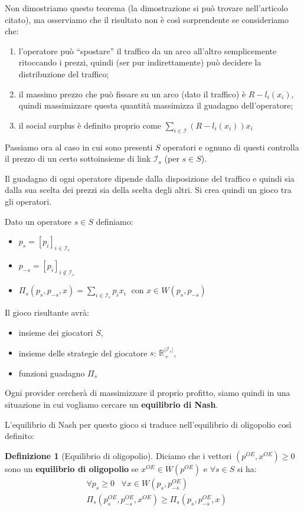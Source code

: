 \documentclass[a4paper]{article}
\newcounter{counter1}
\theoremstyle{plain}
\theoremstyle{definition}
\newtheorem{mydef}[counter1]{Definizione}
\theoremstyle{remark}
\newcommand{\pa}[1]{\left(#1\right)}
\newcommand{\bra}[1]{\left[#1\right]}
\newcommand{\abs}[1]{\left|#1\right|}
\begin{document}
Non dimostriamo questo teorema (la dimostrazione si può trovare
nell'articolo citato), ma osserviamo che il risultato non è così
sorprendente se consideriamo che:
\begin{enumerate}
\item l'operatore può ``spostare'' il traffico da un arco all'altro
  semplicemente ritoccando i prezzi, quindi (ser pur indirettamente)
  può decidere la distribuzione del traffico;
\item il massimo prezzo che può fissare su un arco (dato il traffico)
  è $R - l_i(x_i)$, quindi massimizzare questa quantità massimizza il
  guadagno dell'operatore;
\item il social surplus è definito proprio come
  $\sum _{i\in\mathcal{I}}\pa{ R - l_i\pa{x_i}}x_i$
\end{enumerate}


Passiamo ora al caso in cui sono presenti $S$ operatori e ognuno di
questi controlla il prezzo di un certo sottoinsieme di link
$\mathcal{I}_s$ (per $s\in S$).

Il guadagno di ogni operatore dipende dalla disposizione del traffico
e quindi sia dalla sua scelta dei prezzi sia della scelta degli
altri. Si crea quindi un gioco tra gli operatori.

Dato un operatore $s\in S$ definiamo:
\begin{itemize}
\item $p_s = \bra{p_i}_{i\in \mathcal{I}_s}$
\item $p_{-s} = \bra{p_i}_{i\not\in \mathcal{I}_s}$
\item $\displaystyle \Pi _s \pa{p_s, p_{-s},x} = \sum _{i\in
    \mathcal{I}_s} p_i x_i\;$ con $x\in W\pa{p_s, p_{-s}}$
\end{itemize}

Il gioco risultante avrà:
\begin{itemize}
\item insieme dei giocatori $S$,
\item insieme delle strategie del giocatore $s$: $\mathbb{R}_+
  ^{\abs{\mathcal{I}_s}}$,
\item funzioni guadagno $\Pi _s$
\end{itemize}

Ogni provider cercherà di massimizzare il proprio profitto, siamo
quindi in una situazione in cui vogliamo cercare un \textbf{equilibrio
  di Nash}.

L'equilibrio di Nash per questo gioco si traduce nell'equilibrio di
oligopolio così definito:
\begin{mydef}[Equilibrio di oligopolio]
  Diciamo che i vettori $\pa{p^{OE},x^{OE}}\ge 0$ sono un
  \textbf{equilibrio di oligopolio} se $x^{OE}\in W\pa{p^{OE}}$ e
  $\forall s\in S$ si ha:
  \begin{align*}
    & \forall p_s \ge 0\;\;\; \forall x\in W\pa{p_s,p^{OE}_{-s}} \\
    & \Pi_s \pa{p^{OE}_s, p^{OE}_{-s},x^{OE}} \ge \Pi _s \pa{p_s, p^{OE}_{-s},x}
  \end{align*}
\end{mydef}
\end{document}
